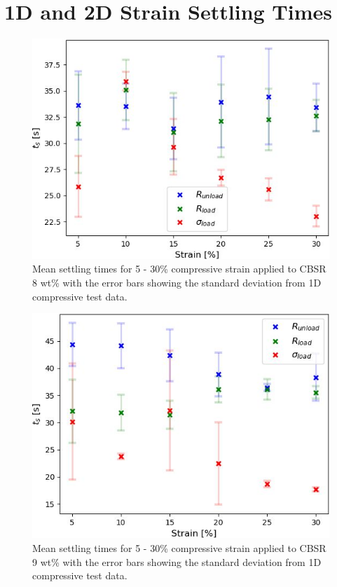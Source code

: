 \section{1D and 2D Strain Settling Times}\label{apdx:Strain Relaxations}
\begin{figure}[H]
	\centering
	\includegraphics[width=0.8\linewidth]{Figures/CBSR_8p_1_10push_XXstrain_60s_ts_vals_vs_strain.jpg}
	\caption{Mean settling times for 5 - 30\% compressive strain applied to CBSR 8 wt\% with the error bars showing the standard deviation from 1D compressive test data.}
	\label{fig:strain_ts_8p_1D}
\end{figure}
\begin{figure}[H]
	\centering
	\includegraphics[width=0.8\linewidth]{Figures/CBSR_9p_1_3push_XXstrain_240s_ts_vals_vs_strain.jpg}
	\caption{Mean settling times for 5 - 30\% compressive strain applied to CBSR 9 wt\% with the error bars showing the standard deviation from 1D compressive test data.}
	\label{fig:strain_ts_9p_1D}
\end{figure}
